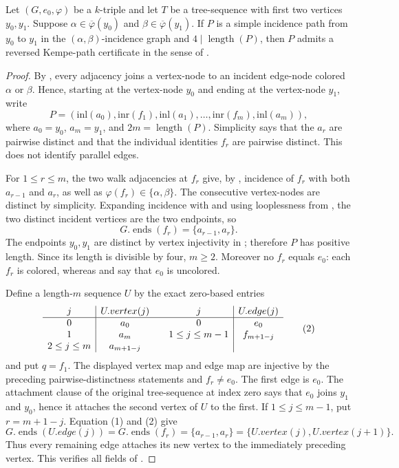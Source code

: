 \begin{lemma}
Let $(G,e_0,\varphi)$ be a $k$-triple and let $T$ be a tree-sequence with
first two vertices $y_0,y_1$.  Suppose
$\alpha\in\overline\varphi(y_0)$ and
$\beta\in\overline\varphi(y_1)$.  If $P$ is a simple incidence path from
$y_0$ to $y_1$ in the $(\alpha,\beta)$-incidence graph and
$4\mid\operatorname{length}(P)$, then $P$ admits a reversed Kempe-path
certificate in the sense of .
\end{lemma}
\begin{proof}
By , every adjacency joins a vertex-node
to an incident edge-node colored $\alpha$ or $\beta$.  Hence, starting at
the vertex-node $y_0$ and ending at the vertex-node $y_1$, write
\[
 P=(\mathrm{inl}(a_0),\mathrm{inr}(f_1),\mathrm{inl}(a_1),
       \ldots,\mathrm{inr}(f_m),\mathrm{inl}(a_m)),
\]
where $a_0=y_0$, $a_m=y_1$, and
$2m=\operatorname{length}(P)$.  Simplicity says that the $a_r$ are
pairwise distinct and that the individual identities $f_r$ are pairwise
distinct.  This does not identify parallel edges.

For $1\leq r\leq m$, the two walk adjacencies at $f_r$ give, by
, incidence of $f_r$ with both
$a_{r-1}$ and $a_r$, as well as
$\varphi(f_r)\in\{\alpha,\beta\}$.  The consecutive vertex-nodes are
distinct by simplicity.  Expanding incidence with  and
using looplessness from , the two distinct
incident vertices are the two endpoints, so
\[
             G.\operatorname{ends}(f_r)=\{a_{r-1},a_r\}.       \tag{1}
\]
The endpoints $y_0,y_1$ are distinct by vertex injectivity in
; therefore $P$ has positive length.  Since its
length is divisible by four, $m\geq2$.  Moreover no $f_r$ equals $e_0$:
each $f_r$ is colored, whereas  and
 say that $e_0$ is uncolored.

Define a length-$m$ sequence $U$ by the exact zero-based entries
\[
 \begin{array}{c|c@{\qquad}c|c}
 j&U.vertex(j)&j&U.edge(j)\\ \hline
 0&a_0&0&e_0\\
 1&a_m&1\leq j\leq m-1&f_{m+1-j}\\
 2\leq j\leq m&a_{m+1-j}&&
 \end{array}                                                     \tag{2}
\]
and put $q=f_1$.  The displayed vertex map and edge map are injective by
the preceding pairwise-distinctness statements and $f_r\ne e_0$.
The first edge is $e_0$.  The attachment clause of the original
tree-sequence at index zero says that $e_0$ joins $y_1$ and $y_0$, hence
it attaches the second vertex of $U$ to the first.  If
$1\leq j\leq m-1$, put $r=m+1-j$.  Equation (1) and (2) give
\[
 G.\operatorname{ends}(U.edge(j))
 =G.\operatorname{ends}(f_r)
 =\{a_{r-1},a_r\}
 =\{U.vertex(j),U.vertex(j+1)\}.
\]
Thus every remaining edge attaches its new vertex to the immediately
preceding vertex.  This verifies all fields of .


\end{proof}
